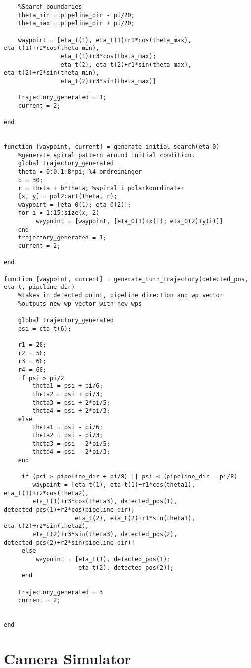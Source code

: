 \begin{lstlisting}
    %Search boundaries
    theta_min = pipeline_dir - pi/20;
    theta_max = pipeline_dir + pi/20;
    
    waypoint = [eta_t(1), eta_t(1)+r1*cos(theta_max), eta_t(1)+r2*cos(theta_min),
 				eta_t(1)+r3*cos(theta_max);
                eta_t(2), eta_t(2)+r1*sin(theta_max), eta_t(2)+r2*sin(theta_min), 
				eta_t(2)+r3*sin(theta_max)]
    
    trajectory_generated = 1;
    current = 2;
    
end


function [waypoint, current] = generate_initial_search(eta_0)
    %generate spiral pattern around initial condition.
    global trajectory_generated
    theta = 0:0.1:8*pi; %4 omdreininger
    b = 30;
    r = theta + b*theta; %spiral i polarkoordinater
    [x, y] = pol2cart(theta, r);
    waypoint = [eta_0(1); eta_0(2)];
    for i = 1:15:size(x, 2)
         waypoint = [waypoint, [eta_0(1)+x(i); eta_0(2)+y(i)]]
    end
    trajectory_generated = 1;
    current = 2;
    
end

function [waypoint, current] = generate_turn_trajectory(detected_pos, eta_t, pipeline_dir)
    %takes in detected point, pipeline direction and wp vector
    %outputs new wp vector with new wps
    
    global trajectory_generated
    psi = eta_t(6);
    
    r1 = 20;
    r2 = 50;
    r3 = 60;
    r4 = 60;
    if psi > pi/2
        theta1 = psi + pi/6;
        theta2 = psi + pi/3;
        theta3 = psi + 2*pi/5;
        theta4 = psi + 2*pi/3;
    else
        theta1 = psi - pi/6;
        theta2 = psi - pi/3;
        theta3 = psi - 2*pi/5;
        theta4 = psi - 2*pi/3;
    end
    
     if (psi > pipeline_dir + pi/8) || psi < (pipeline_dir - pi/8)
        waypoint = [eta_t(1), eta_t(1)+r1*cos(theta1), eta_t(1)+r2*cos(theta2), 
		eta_t(1)+r3*cos(theta3), detected_pos(1), detected_pos(1)+r2*cos(pipeline_dir);
                    eta_t(2), eta_t(2)+r1*sin(theta1), eta_t(2)+r2*sin(theta2), 
		eta_t(2)+r3*sin(theta3), detected_pos(2), detected_pos(2)+r2*sin(pipeline_dir)]
     else
         waypoint = [eta_t(1), detected_pos(1);
                     eta_t(2), detected_pos(2)];
     end
    
    trajectory_generated = 3
    current = 2;
    
    
end
\end{lstlisting}

\section{Camera Simulator}

